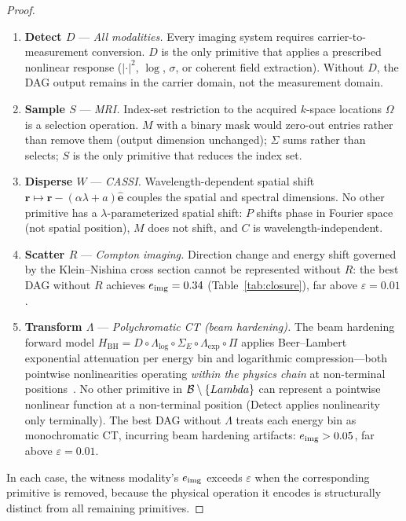 \documentclass[11pt]{article}
\begin{document}
\begin{proof}
\begin{enumerate}
  \item \textbf{Detect $D$} --- \emph{All modalities.} Every imaging system requires carrier-to-measurement conversion. $D$ is the only primitive that applies a prescribed nonlinear response ($|\cdot|^2$, $\log$, $\sigma$, or coherent field extraction). Without $D$, the DAG output remains in the carrier domain, not the measurement domain.

  \item \textbf{Sample $S$} --- \emph{MRI.} Index-set restriction to the acquired $k$-space locations $\Omega$ is a selection operation. $M$ with a binary mask would zero-out entries rather than remove them (output dimension unchanged); $\Sigma$ sums rather than selects; $S$ is the only primitive that reduces the index set.

  \item \textbf{Disperse $W$} --- \emph{CASSI.} Wavelength-dependent spatial shift $\mathbf{r} \mapsto \mathbf{r} - (\alpha\lambda + a)\hat{\mathbf{e}}$ couples the spatial and spectral dimensions. No other primitive has a $\lambda$-parameterized spatial shift: $P$ shifts phase in Fourier space (not spatial position), $M$ does not shift, and $C$ is wavelength-independent.

  \item \textbf{Scatter $R$} --- \emph{Compton imaging.} Direction change and energy shift governed by the Klein--Nishina cross section cannot be represented without $R$: the best DAG without $R$ achieves $e_{\mathrm{img}} = 0.34$ (Table~\ref{tab:closure}), far above $\varepsilon = 0.01$.

  \item \textbf{Transform $\Lambda$} --- \emph{Polychromatic CT (beam hardening).} The beam hardening forward model $H_{\mathrm{BH}} = D \circ \Lambda_{\log} \circ \Sigma_E \circ \Lambda_{\exp} \circ \Pi$ applies Beer--Lambert exponential attenuation per energy bin and logarithmic compression---both pointwise nonlinearities operating \emph{within the physics chain} at non-terminal positions~\cite{deman2001metal}. No other primitive in $\mathcal{B} \setminus \{Lambda\}$ can represent a pointwise nonlinear function at a non-terminal position (Detect applies nonlinearity only terminally). The best DAG without $\Lambda$ treats each energy bin as monochromatic CT, incurring beam hardening artifacts: $e_{\mathrm{img}} > 0.05$, far above $\varepsilon = 0.01$.
\end{enumerate}
In each case, the witness modality's $e_{\mathrm{img}}$ exceeds $\varepsilon$ when the corresponding primitive is removed, because the physical operation it encodes is structurally distinct from all remaining primitives.
\end{proof}
\end{document}
